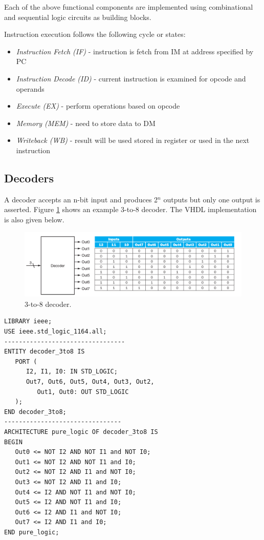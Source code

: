 \documentclass[a4paper, 11pt,oneside]{article}
\begin{document}
Each of the above functional components are implemented using combinational and sequential logic circuits as building blocks. 

Instruction execution follows the following cycle or states:

\begin{itemize}
	\item {\textit{Instruction Fetch (IF)} - instruction is fetch from IM at address specified by PC}
	\item {\textit{Instruction Decode (ID)} - current instruction is examined for opcode and operands }
	\item {\textit{Execute (EX)} - perform operations based on opcode}
	\item {\textit{Memory (MEM)} - need to store data to DM}
	\item {\textit{Writeback (WB)} - result will be used stored in register or used in the next instruction}
\end{itemize}


\subsection{Decoders}
A decoder accepts an n-bit input and produces 2$^n$ outputs but only one output is asserted. Figure \ref{fig:decoder} shows an example 3-to-8 decoder. The VHDL implementation is also given below.


\begin{figure}[H]
	\includegraphics[width=\linewidth]{decoder.png}
	\caption{3-to-8 decoder.}
	\label{fig:decoder} 
\end{figure}

\begin{verbatim}
LIBRARY ieee;
USE ieee.std_logic_1164.all;
---------------------------------
ENTITY decoder_3to8 IS
   PORT (
      I2, I1, I0: IN STD_LOGIC;
      Out7, Out6, Out5, Out4, Out3, Out2, 
         Out1, Out0: OUT STD_LOGIC
   );
END decoder_3to8;
--------------------------------
ARCHITECTURE pure_logic OF decoder_3to8 IS
BEGIN
   Out0 <= NOT I2 AND NOT I1 and NOT I0;
   Out1 <= NOT I2 AND NOT I1 and I0;
   Out2 <= NOT I2 AND I1 and NOT I0;
   Out3 <= NOT I2 AND I1 and I0;
   Out4 <= I2 AND NOT I1 and NOT I0;
   Out5 <= I2 AND NOT I1 and I0;
   Out6 <= I2 AND I1 and NOT I0;
   Out7 <= I2 AND I1 and I0;
END pure_logic;
\end{verbatim}
\end{document}
